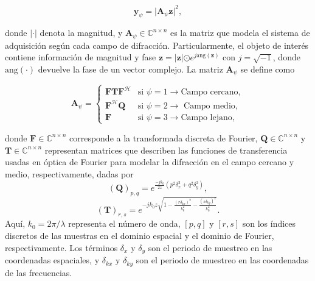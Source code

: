 \begin{equation}
    \mathbf{y}_{\psi}= \vert \mathbf{A}_\psi \mathbf{z} \vert^2,
    \label{eq:diffraction_base}
\end{equation}

donde $\vert \cdot \vert$ denota la magnitud, y $\mathbf{A}_\psi\in\mathbb{C}^{n \times n}$ es la matriz que modela el sistema de adquisición según cada campo de difracción. Particularmente, el objeto de interés contiene información de magnitud y fase $\mathbf{z}=\vert \mathbf{z}|\odot e^{j\mathrm{ang}(\mathbf{z})}$ con $j=\sqrt{-1}$, donde $\mathrm{ang}(\cdot)$ devuelve la fase de un vector complejo. La matriz $\mathbf{A}_\psi$ se define como

\begin{equation}
    \mathbf{A}_\psi = \left\{\begin{matrix}
 \mathbf{F}\mathbf{T}\mathbf{F}^\mathcal{H}    & \text{si } \psi=1\rightarrow \text{Campo cercano},\\ 
 \mathbf{F}^\mathcal{H}\mathbf{Q} &\text{si } \psi=2\rightarrow\text{ Campo medio}, \\ 
 \mathbf{F}  &\text{si } \psi=3\rightarrow\text{Campo lejano},
\end{matrix}\right. \label{eq:matrix_a_no_coded}
\end{equation}

donde $\mathbf{F}\in\mathbb{C}^{n\times n}$ corresponde a la transformada discreta de Fourier, $\mathbf{Q}\in\mathbb{C}^{n\times n}$ y $\mathbf{T}\in\mathbb{C}^{n\times n}$ representan matrices que describen las funciones de transferencia usadas en óptica de Fourier  para modelar la difracción en el campo cercano y medio, respectivamente, dadas por
\begin{equation}
(\mathbf{Q})_{p,q}=e^{\frac{-jk_0}{2z}(p^2\delta_x^2+q^2\delta_y^2)},\label{eq:Qfuncion}
\end{equation}
\begin{equation}
(\mathbf{T})_{r,s}=e^{-jk_0z\sqrt{1-\frac{(r\delta_{kx})^2}{k_0^2}-\frac{(s\delta_{ky})^2}{k_0^2}}}.\label{eq:Tfuncion}
\end{equation}
Aquí, $k_0=2\pi/\lambda$ representa el número de onda, $[p,q]$ y $[r,s]$ son los índices discretos de las muestras en el dominio espacial y el dominio de Fourier, respectivamente. Los términos $\delta_x$ y $\delta_y$ son el periodo de muestreo en las coordenadas espaciales, y $\delta_{kx}$ y $\delta_{ky}$ son el periodo de muestreo en las coordenadas de las frecuencias. 

